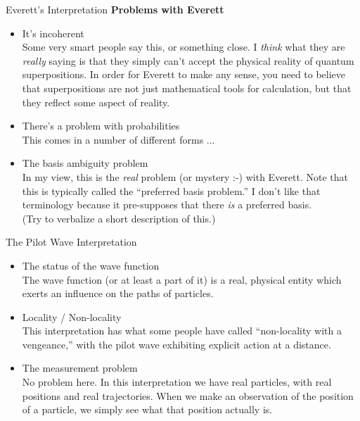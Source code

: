\documentclass[9pt,usenames,dvipsnames]{beamer}
\begin{document}
\begin{frame}[t]{Everett's Interpretation}
\vspace{0pt}
{\bf Problems with Everett}
\begin{itemize}
\vspace{6pt}
\item It's incoherent
    \vspace{6pt}\\
    Some very smart people say this, or something close. I {\it think}
    what they are {\it really} saying is that they simply can't accept
    the physical reality of quantum superpositions. In order for Everett
    to make any sense, you need to believe that superpositions are not
    just mathematical tools for calculation, but that they reflect some
    aspect of reality.
\vspace{6pt}
\item There's a problem with probabilities
    \vspace{6pt}\\
    This comes in a number of different forms ...
\vspace{6pt}
\item The basis ambiguity problem
    \vspace{6pt}\\
    In my view, this is the {\it real} problem (or mystery :-) with Everett.
    Note that
    this is typically called the ``preferred basis problem.'' I don't like
    that terminology because it pre-supposes that there {\it is} a preferred
    basis.
    \vspace{6pt}\\
    (Try to verbalize a short description of this.)
\end{itemize}
\end{frame}

\begin{frame}[t]{The Pilot Wave Interpretation}
\begin{itemize}
  \item The status of the wave function
  \vspace{6pt}\\
    The wave function (or at least a part of it) is a real, physical entity
    which exerts an influence on the paths of particles.
  \vspace{6pt}
  \item Locality / Non-locality
  \vspace{6pt}\\
    This interpretation has what some people have called 
    ``non-locality with a vengeance,'' with the pilot wave exhibiting explicit
    action at a distance.
  \vspace{6pt}
  \item The measurement problem
  \vspace{6pt}\\
    No problem here. In this interpretation we have real particles, with
    real positions and real trajectories. When we make an observation of
    the position of a particle, we simply see what that position actually is.
\end{itemize}
\end{frame}
\end{document}
